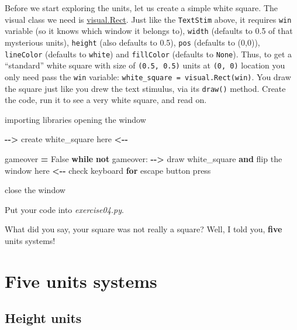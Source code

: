 \documentclass[
]{book}
\newenvironment{Shaded}{\begin{snugshade}}{\end{snugshade}}
\newcommand{\ControlFlowTok}[1]{\textcolor[rgb]{0.13,0.29,0.53}{\textbf{#1}}}
\newcommand{\KeywordTok}[1]{\textcolor[rgb]{0.13,0.29,0.53}{\textbf{#1}}}
\newcommand{\NormalTok}[1]{#1}
\newcommand{\OperatorTok}[1]{\textcolor[rgb]{0.81,0.36,0.00}{\textbf{#1}}}
\newcommand{\VariableTok}[1]{\textcolor[rgb]{0.00,0.00,0.00}{#1}}
\begin{document}
Before we start exploring the units, let us create a simple white square. The visual class we need is \href{https://psychopy.org/api/visual/rect.html}{visual.Rect}. Just like the \texttt{TextStim} above, it requires \texttt{win} variable (so it knows which window it belongs to), \texttt{width} (defaults to 0.5 of that mysterious units), \texttt{height} (also defaults to 0.5), \texttt{pos} (defaults to (0,0)), \texttt{lineColor} (defaults to \texttt{white}) and \texttt{fillColor} (defaults to \texttt{None}). Thus, to get a ``standard'' white square with size of \texttt{(0.5,\ 0.5)} units at \texttt{(0,\ 0)} location you only need pass the \texttt{win} variable: \texttt{white\_square\ =\ visual.Rect(win)}. You draw the square just like you drew the text stimulus, via its \texttt{draw()} method. Create the code, run it to see a very white square, and read on.

\begin{Shaded}
\begin{Highlighting}[]
\NormalTok{importing libraries}
\NormalTok{opening the window}

\OperatorTok{{-}{-}\textgreater{}}\NormalTok{ create white\_square here }\OperatorTok{\textless{}{-}{-}}

\NormalTok{gameover }\OperatorTok{=} \VariableTok{False}
\ControlFlowTok{while} \KeywordTok{not}\NormalTok{ gameover:}
    \OperatorTok{{-}{-}\textgreater{}}\NormalTok{ draw white\_square }\KeywordTok{and}\NormalTok{ flip the window here }\OperatorTok{\textless{}{-}{-}}
\NormalTok{    check keyboard }\ControlFlowTok{for}\NormalTok{ escape button press}

\NormalTok{close the window}
\end{Highlighting}
\end{Shaded}

Put your code into \emph{exercise04.py}.

What did you say, your square was not really a square? Well, I told you, \textbf{five} units systems!

\hypertarget{five-units-systems}{%
\section{Five units systems}\label{five-units-systems}}

\hypertarget{height-units}{%
\subsection{Height units}\label{height-units}}
\end{document}
